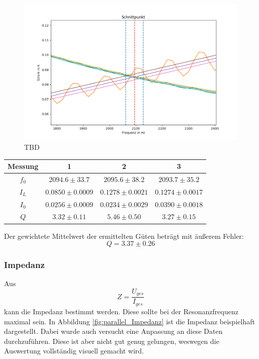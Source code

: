 \documentclass[12pt,a4paper]{article}
\begin{document}
\begin{figure}
\centering
\includegraphics[scale=0.7]{Bilder/Parallel_Stromhoch.png}
\caption{TBD}
\label{fig:parallel_Stromhoch}
\end{figure}

\begin{table}
\centering
\begin{tabular}{|c|c|c|c|}
\hline
Messung & 1 & 2 & 3\\
\hline
$f_0$ & $2094.6\pm 33.7$ & $2095.6\pm 38.2$ & $2093.7\pm 35.2$\\
\hline
$I_L$ & $0.0850\pm 0.0009$ & $0.1278\pm 0.0021$ & $0.1274\pm 0.0017$ \\
\hline
$I_0$ & $0.0256\pm 0.0009$ & $0.0234\pm 0.0029$ & $0.0390\pm 0.0018$ \\
\hline
$Q$ & $3.32\pm 0.11$ & $5.46\pm 0.50$ & $3.27\pm 0.15$ \\
\hline
\end{tabular}
\label{tab:Stromhoch_Rohdaten}
\end{table}
Der gewichtete Mittelwert der ermittelten Güten beträgt mit äußerem Fehler:
\begin{equation}
Q = 3.37\pm 0.26 
\end{equation}

\subsubsection{Impedanz}
Aus
\begin{equation}
Z = \dfrac{U_{ges}}{I_{ges}}
\end{equation}
kann die Impedanz bestimmt werden. Diese sollte bei der Resonanzfrequenz maximal sein. In Abbildung \ref{fig:parallel_Impedanz} ist die Impedanz beispielhaft dargestellt. Dabei wurde auch versucht eine Anpassung an diese Daten durchzuführen. Diese ist aber nicht gut genug gelungen, weswegen die Auswertung vollständig visuell gemacht wird.\\
\end{document}
